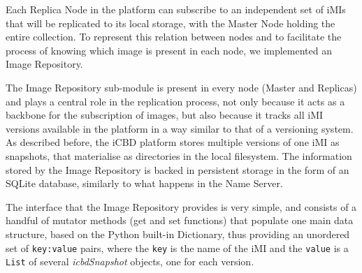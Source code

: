 


Each Replica Node in the platform can subscribe to an independent set of iMIs that will be replicated to its local storage, with the Master Node holding the entire collection. To represent this relation between nodes and to facilitate the process of knowing which image is present in each node, we implemented an Image Repository.

The Image Repository sub-module is present in every node (Master and Replicas) and plays a central role in the replication process, not only because it acts as a backbone for the subscription of images, but also because it tracks all iMI versions available in the platform in a way similar to that of a versioning system. As described before, the iCBD platform stores multiple versions of one iMI as snapshots, that materialise as directories in the local filesystem. The information stored by the Image Repository is backed in persistent storage in the form of an SQLite database, similarly to what happens in the Name Server.

The interface that the Image Repository provides is very simple, and consists of a handful of mutator methods (get and set functions) that populate one main data structure, based on the Python built-in Dictionary, thus providing an unordered set of \texttt{key:value} pairs, where the \texttt{key} is the name of the iMI and the \texttt{value} is a \texttt{List} of several \textit{icbdSnapshot} objects, one for each version.

